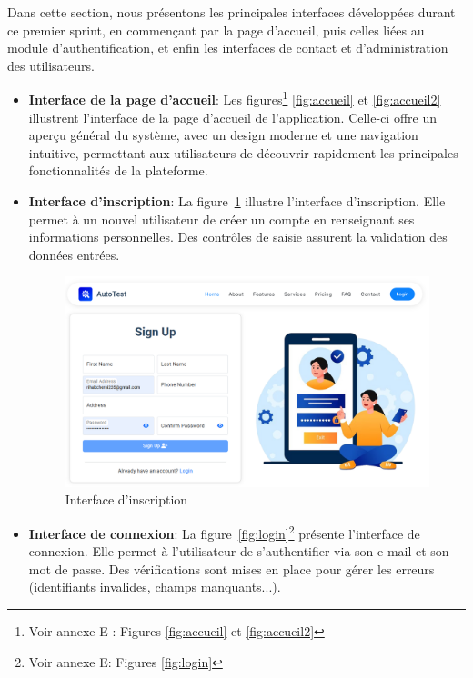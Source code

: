 Dans cette section, nous présentons les principales interfaces développées durant ce premier sprint, en commençant par la page d’accueil, puis celles liées au module d’authentification, et enfin les interfaces de contact et d'administration des utilisateurs.
\begin{itemize}[label=$\bullet$]
    \item  \textbf{Interface de la page d’accueil}: Les figures\footnote{Voir annexe E : Figures \ref{fig:accueil} et \ref{fig:accueil2}} \ref{fig:accueil} et \ref{fig:accueil2} illustrent l’interface de la page d’accueil de l’application. Celle-ci offre un aperçu général du système, avec un design moderne et une navigation intuitive, permettant aux utilisateurs de découvrir rapidement les principales fonctionnalités de la plateforme.
    \item \textbf{Interface d’inscription}:
        La figure~\ref{fig:register} illustre l’interface d’inscription. Elle permet à un nouvel utilisateur de créer un compte en renseignant ses informations personnelles. Des contrôles de saisie assurent la validation des données entrées.  
        \begin{figure}[H]
            \centering
            \includegraphics[width=\linewidth]{chapitres/ch3Sp1/section/sprint1/img/interface/register.png}
            \caption{\centering Interface d'inscription}
            \label{fig:register}
        \end{figure}
        \vspace{-0.3cm}
    \item \textbf{Interface de connexion}:
        La figure~\ref{fig:login}\footnote{Voir annexe E: Figures \ref{fig:login}} présente l’interface de connexion. Elle permet à l’utilisateur de s’authentifier via son e-mail et son mot de passe. Des vérifications sont mises en place pour gérer les erreurs (identifiants invalides, champs manquants...).

\end{itemize}
